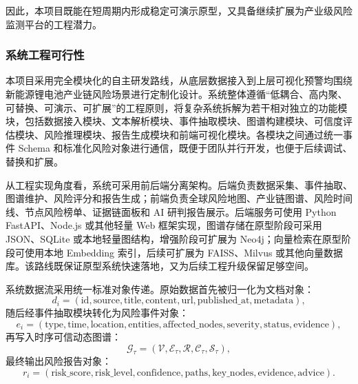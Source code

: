 \documentclass[12pt,a4paper]{article}
\begin{document}
因此，本项目既能在短周期内形成稳定可演示原型，又具备继续扩展为产业级风险监测平台的工程潜力。

\subsubsection{系统工程可行性}

本项目采用完全模块化的自主研发路线，从底层数据接入到上层可视化预警均围绕新能源锂电池产业链风险场景进行定制化设计。系统整体遵循“低耦合、高内聚、可替换、可演示、可扩展”的工程原则，将复杂系统拆解为若干相对独立的功能模块，包括数据接入模块、文本解析模块、事件抽取模块、图谱构建模块、可信度评估模块、风险推理模块、报告生成模块和前端可视化模块。各模块之间通过统一事件 Schema 和标准化风险对象进行通信，既便于团队并行开发，也便于后续调试、替换和扩展。

从工程实现角度看，系统可采用前后端分离架构。后端负责数据采集、事件抽取、图谱维护、风险评分和报告生成；前端负责全球风险地图、产业链图谱、风险时间线、节点风险榜单、证据链面板和 AI 研判报告展示。后端服务可使用 Python FastAPI、Node.js 或其他轻量 Web 框架实现，图谱存储在原型阶段可采用 JSON、SQLite 或本地轻量图结构，增强阶段可扩展为 Neo4j；向量检索在原型阶段可使用本地 Embedding 索引，后续可扩展为 FAISS、Milvus 或其他向量数据库。该路线既保证原型系统快速落地，又为后续工程升级保留足够空间。

系统数据流采用统一标准对象传递。原始数据首先被归一化为文档对象：
\begin{equation}
d_i=(\text{id},\text{source},\text{title},\text{content},\text{url},\text{published\_at},\text{metadata}),
\end{equation}
随后经事件抽取模块转化为风险事件对象：
\begin{equation}
e_i=(\text{type},\text{time},\text{location},\text{entities},\text{affected\_nodes},\text{severity},\text{status},\text{evidence}),
\end{equation}
再写入时序可信动态图谱：
\begin{equation}
\mathcal{G}_{\tau}=(\mathcal{V},\mathcal{E}_{\tau},\mathcal{R},\mathcal{C}_{\tau},\mathcal{S}_{\tau}),
\end{equation}
最终输出风险报告对象：
\begin{equation}
r_i=(\text{risk\_score},\text{risk\_level},\text{confidence},\text{paths},\text{key\_nodes},\text{evidence},\text{advice}).
\end{equation}
\end{document}

